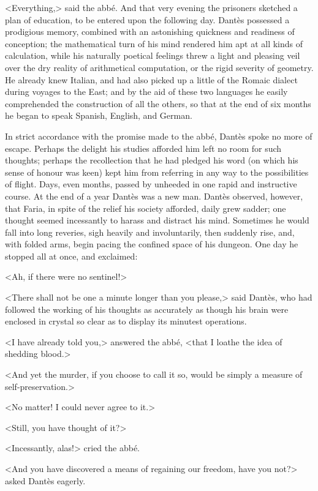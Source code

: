  <Everything,> said the abbé. And that very evening the prisoners sketched a plan of education, to be entered upon the following day. Dantès possessed a prodigious memory, combined with an astonishing quickness and readiness of conception; the mathematical turn of his mind rendered him apt at all kinds of calculation, while his naturally poetical feelings threw a light and pleasing veil over the dry reality of arithmetical computation, or the rigid severity of geometry. He already knew Italian, and had also picked up a little of the Romaic dialect during voyages to the East; and by the aid of these two languages he easily comprehended the construction of all the others, so that at the end of six months he began to speak Spanish, English, and German. 

 In strict accordance with the promise made to the abbé, Dantès spoke no more of escape. Perhaps the delight his studies afforded him left no room for such thoughts; perhaps the recollection that he had pledged his word (on which his sense of honour was keen) kept him from referring in any way to the possibilities of flight. Days, even months, passed by unheeded in one rapid and instructive course. At the end of a year Dantès was a new man. Dantès observed, however, that Faria, in spite of the relief his society afforded, daily grew sadder; one thought seemed incessantly to harass and distract his mind. Sometimes he would fall into long reveries, sigh heavily and involuntarily, then suddenly rise, and, with folded arms, begin pacing the confined space of his dungeon. One day he stopped all at once, and exclaimed: 

 <Ah, if there were no sentinel!> 

 <There shall not be one a minute longer than you please,> said Dantès, who had followed the working of his thoughts as accurately as though his brain were enclosed in crystal so clear as to display its minutest operations. 

 <I have already told you,> answered the abbé, <that I loathe the idea of shedding blood.> 

 <And yet the murder, if you choose to call it so, would be simply a measure of self-preservation.> 

 <No matter! I could never agree to it.> 

 <Still, you have thought of it?> 

 <Incessantly, alas!> cried the abbé. 

 <And you have discovered a means of regaining our freedom, have you not?> asked Dantès eagerly. 

